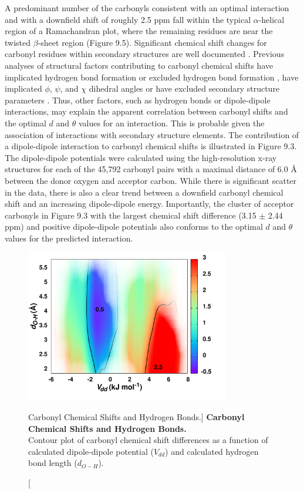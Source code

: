 \begin{doublespace}
A predominant number of the carbonyls consistent with an optimal \npistar{}
interaction and with a downfield shift of roughly 2.5 ppm fall within the
typical $\alpha$-helical region of a Ramachandran plot, where the remaining
residues are near the twisted $\beta$-sheet region (Figure 9.5). Significant
chemical shift changes for carbonyl residues within
secondary structures are well documented \cite{wang:protsci2002}.
Previous analyses of structural factors contributing to carbonyl \cnmr{}
chemical shifts have implicated hydrogen bond formation
\cite{dedios:sci1993,asakawa:jacs1992,wylie:jacs2007}
or excluded hydrogen bond formation
\cite{cisnetti:cpc2004,neal:jbnmr2003,markwick:jacs2004}, have
implicated $\phi$, $\psi$, and $\chi$ dihedral angles
\cite{neal:jbnmr2003} or have excluded secondary structure parameters
\cite{cisnetti:cpc2004,dedios:sci1993}. Thus, other factors,
such as hydrogen bonds or dipole-dipole interactions, may explain the apparent
correlation between carbonyl \cnmr{} shifts and the optimal $d$ and $\theta$
values for an \npistar{} interaction. This is probable given the association of
\npistar{} interactions with secondary structure elements. The contribution of
a dipole-dipole interaction to carbonyl \cnmr{} chemical shifts is illustrated
in Figure 9.3. The dipole-dipole potentials were calculated using the
high-resolution x-ray structures for each of the 45,792 carbonyl pairs with a
maximal distance of 6.0 \r{A} between the donor oxygen and acceptor carbon.
While there is significant scatter in the data, there is also a clear trend
between a downfield carbonyl \cnmr{} chemical shift and an increasing
dipole-dipole energy. Importantly, the cluster of acceptor carbonyls in
Figure 9.3 with the largest \cnmr{} chemical shift difference
(3.15 $\pm$ 2.44 ppm) and positive dipole-dipole potentials also conforms to
the optimal $d$ and $\theta$ values for the predicted \npistar{} interaction.
\end{doublespace}

\begin{figure}
\includegraphics[width=3.5in]{figs/npistar/06-hbonds.png}
\caption
      [Carbonyl \cnmr{} Chemical Shifts and Hydrogen Bonds.]{
  {\bf Carbonyl \cnmr{} Chemical Shifts and Hydrogen Bonds.}
  \\
  Contour plot of \cnmr{} carbonyl chemical shift differences as a function
  of calculated dipole-dipole potential ($V_{dd}$) and calculated hydrogen
  bond length ($d_{O-H}$).
}
\end{figure}

